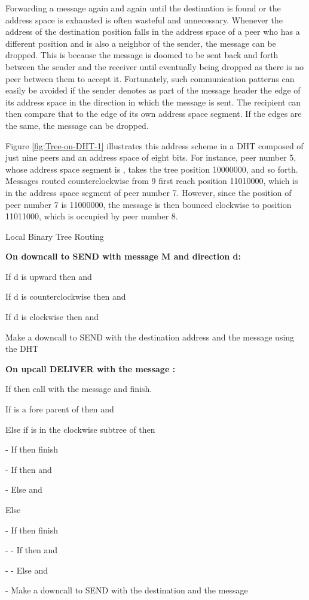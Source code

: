 \documentclass[12pt,english,journal]{elsarticle}
\numberwithin{equation}{section}
\numberwithin{figure}{section}
\theoremstyle{plain}
\theoremstyle{plain}
\begin{document}
Forwarding a message again and again until the destination is found
or the address space is exhausted is often wasteful and unnecessary.
Whenever the address of the destination position falls in the address
space of a peer who has a different position and is also a neighbor
of the sender, the message can be dropped. This is because the message
is doomed to be sent back and forth between the sender and the receiver
until eventually being dropped as there is no peer between them to
accept it. Fortunately, such communication patterns can easily be
avoided if the sender denotes as part of the message header the edge
of its address space in the direction in which the message is sent.
The recipient can then compare that to the edge of its own address
space segment. If the edges are the same, the message can be dropped.

Figure \ref{fig:Tree-on-DHT-1} illustrates this address scheme in
a DHT composed of just nine peers and an address space of eight bits.
For instance, peer number 5, whose address space segment is ,
takes the tree position 10000000, and so forth. Messages routed counterclockwise
from 9 first reach position 11010000, which is in the address space
segment of peer number 7. However, since the position of peer number
7 is 11000000, the message is then bounced clockwise to position 11011000,
which is occupied by peer number 8.



\begin{algorithm*}
\caption{\label{alg:CCWandCW}Local Binary Tree Routing}


\textbf{On downcall to SEND with message M and direction d:}

If d is upward then  and 

If d is counterclockwise then 
and 

If d is clockwise then  and


Make a downcall to SEND with the destination address  and the
message  using the
DHT

\textbf{On upcall DELIVER with the message :}

If  then call  with the message  and finish.

If  is a fore parent of  then 
and 

Else if  is in the clockwise subtree of  then

- If  then finish

- If  then 
and 

- Else  and 

Else

- If  then finish

- - If  then 
and 

- - Else  and 

- Make a downcall to SEND with the destination  and the
message 
\end{algorithm*}
\end{document}

